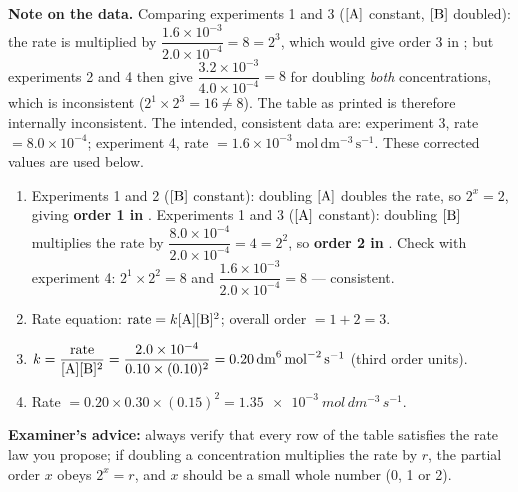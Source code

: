 \documentclass[11pt]{article}
\begin{document}
\begin{corrige}
\textbf{Note on the data.} Comparing experiments 1 and 3 ($[\ce{A}]$ constant, $[\ce{B}]$ doubled): the rate is multiplied by $\dfrac{1.6\times 10^{-3}}{2.0\times 10^{-4}} = 8 = 2^{3}$, which would give order 3 in ; but experiments 2 and 4 then give $\dfrac{3.2\times 10^{-3}}{4.0\times 10^{-4}} = 8$ for doubling \emph{both} concentrations, which is inconsistent ($2^{1}\times 2^{3} = 16 \neq 8$). The table as printed is therefore internally inconsistent. The intended, consistent data are: experiment 3, rate $= 8.0\times 10^{-4}$; experiment 4, rate $= 1.6\times 10^{-3}\ \mathrm{mol\,dm^{-3}\,s^{-1}}$. These corrected values are used below.
\begin{enumerate}
\item Experiments 1 and 2 ($[\ce{B}]$ constant): doubling $[\ce{A}]$ doubles the rate, so $2^{x} = 2$, giving \textbf{order 1 in }. Experiments 1 and 3 ($[\ce{A}]$ constant): doubling $[\ce{B}]$ multiplies the rate by $\dfrac{8.0\times 10^{-4}}{2.0\times 10^{-4}} = 4 = 2^{2}$, so \textbf{order 2 in }. Check with experiment 4: $2^{1}\times 2^{2} = 8$ and $\dfrac{1.6\times 10^{-3}}{2.0\times 10^{-4}} = 8$ — consistent.
\item Rate equation: $\text{rate} = k[\ce{A}][\ce{B}]^{2}$; overall order $= 1 + 2 = 3$.
\item $k = \dfrac{\text{rate}}{[\ce{A}][\ce{B}]^{2}} = \dfrac{2.0\times 10^{-4}}{0.10 \times (0.10)^{2}} = \SI{0.20}{dm^{6}\,mol^{-2}\,s^{-1}}$ (third order units).
\item Rate $= 0.20 \times 0.30 \times (0.15)^{2} = \SI{1.35e-3}{mol\,dm^{-3}\,s^{-1}}$.
\end{enumerate}
\textbf{Examiner's advice:} always verify that every row of the table satisfies the rate law you propose; if doubling a concentration multiplies the rate by $r$, the partial order $x$ obeys $2^{x} = r$, and $x$ should be a small whole number (0, 1 or 2).
\end{corrige}
\end{document}
